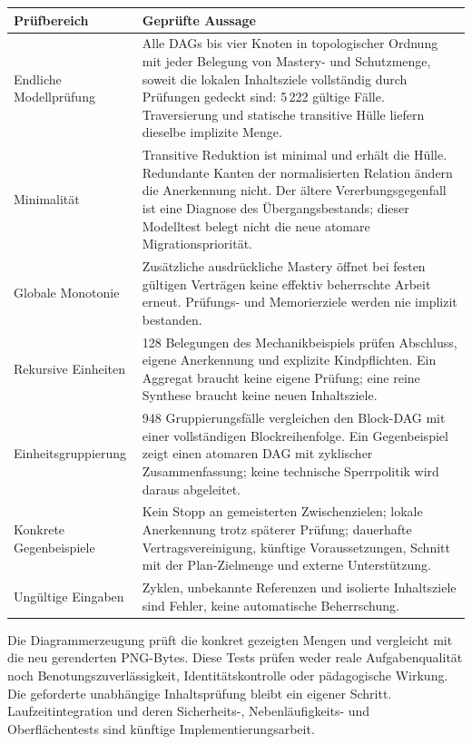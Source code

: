 \begin{longtable}{@{}P{38mm}P{110mm}@{}}
\toprule
Prüfbereich & Geprüfte Aussage\\
\midrule\endhead
Endliche Modellprüfung & Alle DAGs bis vier Knoten in topologischer
Ordnung mit jeder Belegung von Mastery- und Schutzmenge, soweit die lokalen
Inhaltsziele vollständig durch Prüfungen gedeckt sind:
5\,222 gültige Fälle. Traversierung und statische transitive Hülle
liefern dieselbe implizite Menge.\\
Minimalität & Transitive Reduktion ist minimal und erhält die Hülle.
Redundante Kanten der normalisierten Relation ändern die Anerkennung
nicht. Der ältere Vererbungsgegenfall ist eine Diagnose des
Übergangsbestands; dieser
Modelltest belegt nicht die neue atomare Migrationspriorität.\\
Globale Monotonie & Zusätzliche ausdrückliche Mastery öffnet bei festen
gültigen Verträgen keine effektiv beherrschte Arbeit erneut. Prüfungs-
und Memorierziele werden nie implizit bestanden.\\
Rekursive Einheiten & 128 Belegungen des Mechanikbeispiels prüfen
Abschluss, eigene Anerkennung und explizite Kindpflichten. Ein Aggregat
braucht keine eigene Prüfung; eine reine Synthese braucht keine neuen
Inhaltsziele.\\
Einheitsgruppierung & 948 Gruppierungsfälle vergleichen den Block-DAG
mit einer vollständigen Blockreihenfolge. Ein Gegenbeispiel zeigt einen
atomaren DAG mit zyklischer Zusammenfassung; keine technische Sperrpolitik
wird daraus abgeleitet.\\
Konkrete Gegenbeispiele & Kein Stopp an gemeisterten Zwischenzielen;
lokale Anerkennung trotz späterer Prüfung; dauerhafte Vertragsvereinigung,
künftige Voraussetzungen, Schnitt mit der Plan-Zielmenge und externe
Unterstützung.\\
Ungültige Eingaben & Zyklen, unbekannte Referenzen und isolierte
Inhaltsziele sind Fehler, keine automatische Beherrschung.\\
\bottomrule
\end{longtable}

Die Diagrammerzeugung prüft die konkret gezeigten Mengen und vergleicht mit
 die neu gerenderten PNG-Bytes. Diese Tests prüfen weder
reale Aufgabenqualität noch Benotungszuverlässigkeit, Identitätskontrolle
oder pädagogische Wirkung. Die geforderte unabhängige Inhaltsprüfung
bleibt ein eigener Schritt. Laufzeitintegration und deren Sicherheits-,
Nebenläufigkeits- und Oberflächentests sind künftige Implementierungsarbeit.

